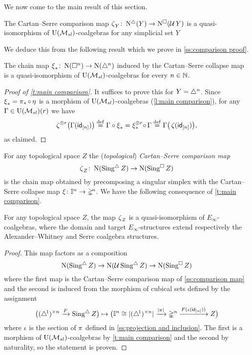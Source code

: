 We now come to the main result of this section.

\begin{theorem} \label{t:main comparison}
	The Cartan--Serre comparison map $\operatorname{\zeta}_Y \colon \operatorname{N^{\triangle}}(Y) \to \operatorname{N^{\square}}(\operatorname{\mathcal{U}} Y)$ is a quasi-isomorphism of ${\operatorname{U}(\mathcal{M}_{sl})}$-coalgebras for any simplicial set $Y$
\end{theorem}

We deduce this from the following result which we prove in \cref{ss:comparison proof}.

\begin{lemma} \label{l:main comparison}
	The chain map $\operatorname{\xi}_\ast \colon \operatorname{N}(\square^n) \to \operatorname{N}(\triangle^n)$ induced by the Cartan--Serre collapse map is a quasi-isomorphism of ${\operatorname{U}(\mathcal{M}_{sl})}$-coalgebras for every $n \in \mathbb{N}$.
\end{lemma}

\begin{proof}[Proof of \cref{t:main comparison}]
	It suffices to prove this for $Y = \triangle^n$.
	Since $\operatorname{\xi}_\ast = \operatorname{\pi}_\ast \circ \operatorname{\eta}$ is a morphism of ${\operatorname{U}(\mathcal{M}_{sl})}$-coalgebras (\cref{l:main comparison}), for any $\Gamma \in {\operatorname{U}(\mathcal{M}_{sl})}(r)$ we have
	\begin{align*}
	\operatorname{\zeta}^{\otimes r} \! \big( \Gamma(\mathsf{id}_{[n]}) \big) \stackrel{\mathrm{def}}{=}
	\Gamma \circ \operatorname{\xi}_\ast =
	\operatorname{\xi}_\ast^{\otimes r} \! \circ \, \Gamma \stackrel{\mathrm{def}}{=}
	\Gamma \big( \operatorname{\zeta} (\mathsf{id}_{[n]}) \big),
	\end{align*}
	as claimed.
\end{proof}

For any topological space $Z$ the (\textit{topological}) \textit{Cartan--Serre comparison map}
\[
\operatorname{\zeta}_Z \colon \operatorname{N}(\operatorname{Sing^{\triangle}} Z) \to \operatorname{N}(\operatorname{Sing^{\square}} Z)
\]
is the chain map obtained by precomposing a singular simplex with the Cartan--Serre collapse map $\operatorname{\xi} \colon \mathbb{I}^n \to \mathbb{\Delta}^{\!n}$.
We have the following consequence of \cref{t:main comparison}.

\begin{corollary} \label{t:topological comparison}
	For any topological space $Z$, the map $\operatorname{\zeta}_Z$ is a quasi-isomorphism of $E_\infty$-coalgebras, where the domain and target $E_\infty$-structures extend respectively the Alexander--Whitney and Serre coalgebra structures.
\end{corollary}

\begin{proof}
	This map factors as a composition
	\[
	\operatorname{N}(\operatorname{Sing^{\triangle}} Z) \to \operatorname{N}(\operatorname{\mathcal{U}} \operatorname{Sing^{\triangle}} Z) \to \operatorname{N}(\operatorname{Sing^{\square}} Z)
	\]
	where the first map is the Cartan--Serre comparison map of \cref{ss:comparison map} and the second is induced from the morphism of cubical sets defined by the assignment
	\[
	\big( (\triangle^{\!1})^{\times n} \xrightarrow{F} \operatorname{Sing^{\triangle}} Z \big) \mapsto
	\big( \mathbb{I}^n \cong \lvert(\triangle^{\!1})^{\times n}\rvert \xrightarrow{\lvert\operatorname{\pi}\rvert} \mathbb{\Delta}^n \xrightarrow{F(\operatorname{\iota}(\mathsf{id}_{[n]}))} Z \big)
	\]
	where $\operatorname{\iota}$ is the section of $\operatorname{\pi}$ defined in \cref{ss:projection and inclusion}.
	The first is a morphism of ${\operatorname{U}(\mathcal{M}_{sl})}$-coalgebras by \cref{t:main comparison} and the second by naturality, so the statement is proven.
\end{proof}


